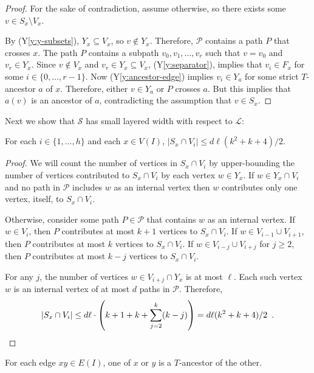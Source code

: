 \documentclass{patmorin}
\newcommand{\yref}[1]{(Y\ref{y:#1})}
\begin{document}
\begin{proof}
  For the sake of contradiction, assume otherwise, so there exists some $v\in S_x\setminus V_x$.
  
  By \yref{y-subsets}, $Y_x\subseteq V_x$, so $v\not\in Y_x$.  Therefore, $\mathcal{P}$ contains a path $P$ that crosses $x$.  The path $P$ contains a subpath $v_0,v_1,\ldots,v_{r}$ such that $v=v_0$ and $v_r\in Y_x$. Since $v\not\in V_x$ and $v_r\in Y_x\subseteq V_x$, \yref{separator}, implies that $v_i\in F_x$ for some $i\in\{0,\ldots,r-1\}$. Now \yref{ancestor-edge} implies $v_i\in Y_a$ for some strict $T$-ancestor $a$ of $x$.  Therefore, either $v\in Y_a$ or $P$ crosses $a$. But this implies that $a(v)$ is an ancestor of $a$, contradicting the assumption that $v\in S_x$.
\end{proof}

Next we show that $\mathcal{S}$ has small layered width with respect to $\mathcal{L}$:

\begin{clm}
  For each $i\in\{1,\ldots,h\}$ and each $x\in V(I)$, $|S_x\cap V_i|\le d\ell(k^2+k+4)/2$.  
\end{clm}

\begin{proof}
  We will count the number of vertices in $S_x\cap V_i$ by upper-bounding the number of vertices contributed to $S_x\cap V_i$ by each vertex $w\in Y_x$.
  If $w\in Y_x\cap V_i$ and no path in $\mathcal{P}$ includes $w$ as an internal vertex then $w$ contributes only one vertex, itself, to $S_x\cap V_i$.
  
  Otherwise, consider some path $P\in\mathcal{P}$ that contains $w$ as an internal vertex.  If $w\in V_{i}$, then $P$ contributes at most $k+1$ vertices to $S_x\cap V_i$.  If $w\in V_{i-1}\cup V_{i+1}$, then $P$ contributes at most $k$ vertices to $S_x\cap V_i$. If $w\in V_{i-j}\cup V_{i+j}$ for $j\ge 2$, then $P$ contributes at most $k-j$ vertices to $S_x\cap V_i$.
  
  For any $j$, the number of vertices $w\in V_{i+j}\cap Y_x$ is at most $\ell$. Each such vertex $w$ is an internal vertex of at most $d$ paths in $\mathcal{P}$. Therefore, 
  \[  |S_x\cap V_i|\le d\ell\cdot\left(k+1 + k + \sum_{j=2}^k (k-j)\right) %
      = d\ell(k^2 +k + 4)/2 \enspace . \qedhere
  \]
\end{proof}

\begin{clm}
  For each edge $xy\in E(I)$, one of $x$ or $y$ is a $T$-ancestor of the other.
\end{clm}
\end{document}
